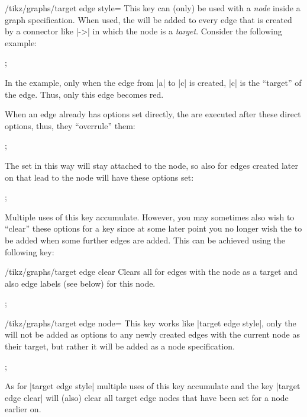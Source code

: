 \begin{key}{/tikz/graphs/target edge style=}
    This key can (only) be used with a \emph{node} inside a graph
    specification. When used, the  will be added to every edge
    that is created by a connector like |->| in which the node is a
    \emph{target}. Consider the following example:
\begin{codeexample}[]
\tikz {};
\end{codeexample}
    In the example, only when the edge from |a| to |c| is created, |c| is the
    ``target'' of the edge. Thus, only this edge becomes red.

    When an edge already has options set directly, the  are
    executed after these direct options, thus, they ``overrule'' them:
\begin{codeexample}[]
\tikz {};
\end{codeexample}

    The  set in this way will stay attached to the node, so also
    for edges created later on that lead to the node will have these options
    set:
\begin{codeexample}[]
\tikz {};
\end{codeexample}

    Multiple uses of this key accumulate. However, you may sometimes also wish
    to ``clear'' these options for a key since at some later point you no
    longer wish the  to be added when some further edges are
    added. This can be achieved using the following key:
    \begin{key}{/tikz/graphs/target edge clear}
        Clears all  for edges with the node as a target and
        also edge labels (see below) for this node.
    \end{key}
\begin{codeexample}[]
\tikz {};
\end{codeexample}
\end{key}

\begin{key}{/tikz/graphs/target edge node=}
    This key works like |target edge style|, only the 
    will not be added as options to any newly created edges with the current
    node as their target, but rather it will be added as a node specification.
\begin{codeexample}[]
\tikz {};
\end{codeexample}
    As for |target edge style| multiple uses of this key accumulate and the key
    |target edge clear| will (also) clear all target edge nodes that have been
    set for a node earlier on.
\end{key}

